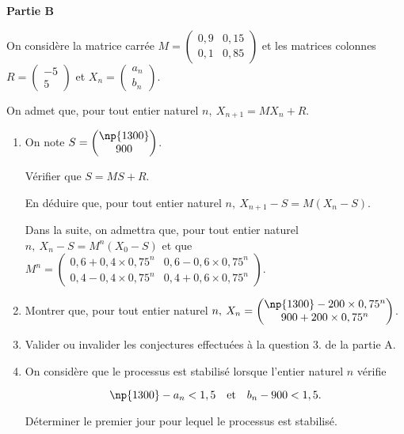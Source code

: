 \documentclass[10pt]{article}
\begin{document}
\bigskip

\textbf{Partie B}

\medskip
 
On considère la matrice carrée $M = \begin{pmatrix}0,9& 0,15\\0,1&0,85
\end{pmatrix}$ et les matrices colonnes $R = \begin{pmatrix}-5\\5 \end{pmatrix}$ et  $X_{n} = \begin{pmatrix}a_{n}\\b_{n}\end{pmatrix}$.
 
On admet que, pour tout entier naturel $n,\: X_{n+1} = M X_{n} + R$. 
 
\medskip

\begin{enumerate}
\item On note $S = \begin{pmatrix} \np{1300}\\ 900\end{pmatrix}$. 

Vérifier que $S = MS + R$.
 
En déduire que, pour tout entier naturel $n,\: X_{n+1} - S = M\left(X_{n} - S\right)$.

\medskip
 
Dans la suite, on admettra que, pour tout entier naturel $n,\: X_{n} - S = M^n\left(X_{0} - S\right)$ et que $M^n = \begin{pmatrix} 0,6 + 0,4 \times 0,75^n& 0,6 - 0,6 \times  0,75^n\\ 
0,4 - 0,4 \times 0,75^n& 0,4 + 0,6 \times 0,75^n \end{pmatrix}$. 

\item Montrer que, pour tout entier naturel $n,\: X_{n} = \begin{pmatrix}\np{1300} - 200 \times 0,75^n\\900 + 200 \times 0,75^n \end{pmatrix}$. 
\item Valider ou invalider les conjectures effectuées à la question 3. de la partie A. 
\item On considère que le processus est stabilisé lorsque l'entier naturel $n$ vérifie 

\[\np{1300} - a_{n} < 1,5\quad  \text{et} \quad  b_{n} - 900 < 1,5.\]
 
Déterminer le premier jour pour lequel le processus est stabilisé.
\end{enumerate}
\end{document}
